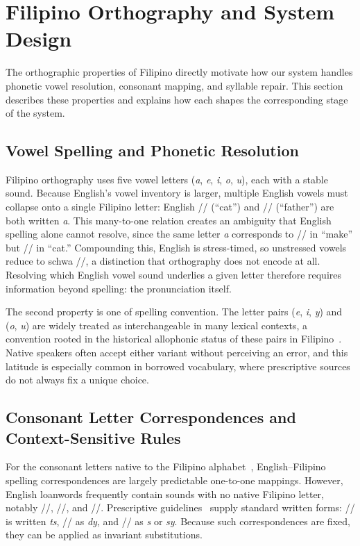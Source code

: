 \section{Filipino Orthography and System Design}\label{sec:filipino_orthography}

The orthographic properties of Filipino directly motivate how our system
handles phonetic vowel resolution, consonant mapping, and syllable repair. This
section describes these properties and explains how each shapes the
corresponding stage of the system.

\subsection{Vowel Spelling and Phonetic Resolution}

Filipino orthography uses five vowel letters (\emph{a}, \emph{e}, \emph{i},
\emph{o}, \emph{u}), each with a stable sound. Because English's vowel
inventory is larger, multiple English vowels must collapse onto a single
Filipino letter: English /\textipa{\ae}/ (``cat'') and //
(``father'') are both written \emph{a}. This many-to-one relation creates an
ambiguity that English spelling alone cannot resolve, since the same letter
\emph{a} corresponds to // in ``make'' but /\textipa{\ae}/ in
``cat.'' Compounding this, English is stress-timed, so unstressed vowels reduce
to schwa //, a distinction that orthography does not encode at all.
Resolving which English vowel sound underlies a given letter therefore requires
information beyond spelling: the pronunciation itself.

The second property is one of spelling convention. The letter pairs (\emph{e},
\emph{i}, \emph{y}) and (\emph{o}, \emph{u}) are widely treated as
interchangeable in many lexical contexts, a convention rooted in the historical
allophonic status of these pairs in Filipino~\cite{schachter1972}. Native
speakers often accept either variant without perceiving an error, and this
latitude is especially common in borrowed vocabulary, where prescriptive
sources do not always fix a unique choice.

\subsection{Consonant Letter Correspondences and Context-Sensitive Rules}

For the consonant letters native to the Filipino alphabet~\cite{llamzon1966},
English--Filipino spelling correspondences are largely predictable one-to-one
mappings. However, English loanwords frequently contain sounds with no native
Filipino letter, notably //, //, and //.
Prescriptive guidelines~\cite{almario2014,llamzon1966} supply standard written
forms: // is written \emph{ts}, // as \emph{dy}, and
// as \emph{s} or \emph{sy}. Because such correspondences are fixed,
they can be applied as invariant substitutions.

